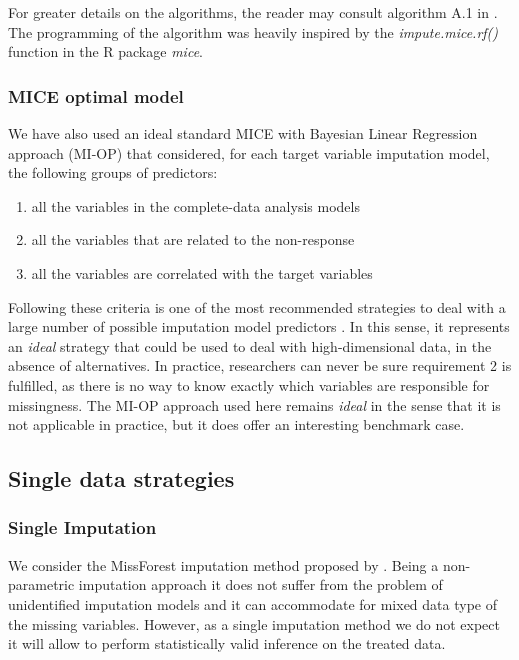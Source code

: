 	For greater details on the algorithms, the reader may consult algorithm A.1 in 
	\cite[p. 103, appendix B]{dooveEtAl:2014}.
	The programming of the algorithm was heavily inspired by the \emph{impute.mice.rf()} function in the 
	R package \emph{mice}.

\subsubsection{MICE optimal model}
	We have also used an ideal standard MICE with Bayesian Linear Regression approach (MI-OP)
	that considered, for each target variable imputation model, the following groups of 
	predictors:

	\begin{enumerate}

	\item all the variables in the complete-data analysis models
	\item all the variables that are related to the non-response
	\item all the variables are correlated with the target variables

	\end{enumerate}

	Following these criteria is one of the most recommended strategies to deal with a large number of 
	possible imputation model predictors \citep[p. 168]{vanBuuren:2012}.
	In this sense, it represents an \emph{ideal} strategy that could be used to deal with high-dimensional data,
	in the absence of alternatives.
	In practice, researchers can never be sure requirement 2 is fulfilled, as there is no way to know exactly 
	which variables are responsible for missingness. The MI-OP approach used here remains \emph{ideal} 
	in the sense that it is not applicable in practice, but it does offer an interesting benchmark case.
	
\subsection{Single data strategies}

\subsubsection{Single Imputation}
	We consider the MissForest imputation method proposed by \cite{stekhovenBuhlmann:2011}. Being a non-parametric
	imputation approach it does not suffer from the problem of unidentified imputation models and it can 
	accommodate for mixed data type of the missing variables. However, as a single imputation method we do not 
	expect it will allow to perform statistically valid inference on the treated data.

